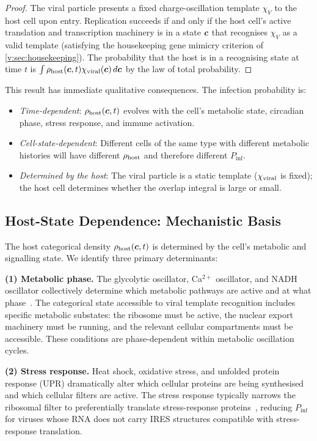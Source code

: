\begin{proof}
The viral particle presents a fixed charge-oscillation template $\chi_V$ to the host cell upon entry. Replication succeeds if and only if the host cell's active translation and transcription machinery is in a state $\boldsymbol{c}$ that recognises $\chi_V$ as a valid template (satisfying the housekeeping gene mimicry criterion of \cref{v:sec:housekeeping}). The probability that the host is in a recognising state at time $t$ is $\int \rho_{\mathrm{host}}(\boldsymbol{c},t) \chi_{\mathrm{viral}}(\boldsymbol{c})\,d\boldsymbol{c}$ by the law of total probability.
\end{proof}

This result has immediate qualitative consequences. The infection probability is:
\begin{itemize}
  \item \emph{Time-dependent}: $\rho_{\mathrm{host}}(\boldsymbol{c}, t)$ evolves with the cell's metabolic state, circadian phase, stress response, and immune activation.
  \item \emph{Cell-state-dependent}: Different cells of the same type with different metabolic histories will have different $\rho_{\mathrm{host}}$ and therefore different $P_{\mathrm{inf}}$.
  \item \emph{Determined by the host}: The viral particle is a static template ($\chi_{\mathrm{viral}}$ is fixed); the host cell determines whether the overlap integral is large or small.
\end{itemize}

\subsection{Host-State Dependence: Mechanistic Basis}

The host categorical density $\rho_{\mathrm{host}}(\boldsymbol{c}, t)$ is determined by the cell's metabolic and signalling state. We identify three primary determinants:

\textbf{(1) Metabolic phase.} The glycolytic oscillator, Ca$^{2+}$ oscillator, and NADH oscillator collectively determine which metabolic pathways are active and at what phase~\cite{Bhalla1999}. The categorical state accessible to viral template recognition includes specific metabolic substates: the ribosome must be active, the nuclear export machinery must be running, and the relevant cellular compartments must be accessible. These conditions are phase-dependent within metabolic oscillation cycles.

\textbf{(2) Stress response.} Heat shock, oxidative stress, and unfolded protein response (UPR) dramatically alter which cellular proteins are being synthesised and which cellular filters are active. The stress response typically narrows the ribosomal filter to preferentially translate stress-response proteins~\cite{Holcik2005}, reducing $P_{\mathrm{inf}}$ for viruses whose RNA does not carry IRES structures compatible with stress-response translation.

